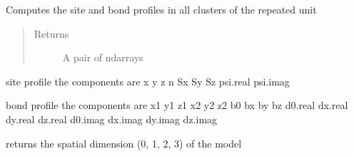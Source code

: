 \documentclass[letterpaper,10pt,english]{sphinxmanual}
\begin{document}

\begin{fulllineitems}
\label{\detokenize{functions:pyqcm.site_and_bond_profile}}
\sphinxAtStartPar
Computes the site and bond profiles in all clusters of the repeated unit
\begin{quote}\begin{description}
\item[{Returns}] \leavevmode
\sphinxAtStartPar
A pair of ndarrays

\end{description}\end{quote}

\sphinxAtStartPar
site profile \textendash{} the components are 
x y z n Sx Sy Sz psi.real psi.imag

\sphinxAtStartPar
bond profile \textendash{} the components are  
x1 y1 z1 x2 y2 z2 b0 bx by bz d0.real dx.real dy.real dz.real d0.imag dx.imag dy.imag dz.imag

\end{fulllineitems}


\begin{fulllineitems}
\label{\detokenize{functions:pyqcm.spatial_dimension}}
\sphinxAtStartPar
returns the spatial dimension (0, 1, 2, 3) of the model

\end{fulllineitems}

\end{document}
